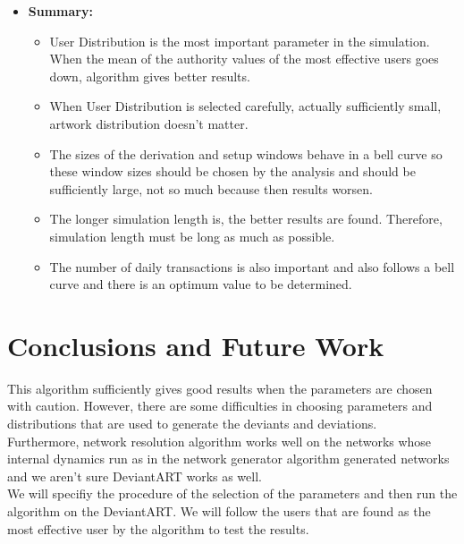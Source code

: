 \documentclass[12pt,a4paper]{report}
\begin{document}
	\begin{itemize}

	\item \textbf{Summary:}

		\begin{itemize}

		\item User Distribution is the most important parameter in the simulation. When the mean of the authority values of the most effective users goes down, algorithm gives better results.

		\item When User Distribution is selected carefully, actually sufficiently small, artwork distribution doesn't matter.

		\item The sizes of the derivation and setup windows behave in a bell curve so these window sizes should be chosen by the analysis and should be sufficiently large, not so much because then results worsen.

		\item The longer simulation length  is, the better results are found. Therefore,  simulation length must be long as much as possible.

		\item The number of daily transactions is also important and also follows a bell curve and there is an optimum value to be determined. 

		\end{itemize}

	\end{itemize}

\chapter{Conclusions and Future Work}

	This algorithm sufficiently gives good results when the parameters are chosen with caution. However, there are some difficulties in choosing parameters and distributions that are used to generate the deviants and deviations. \\

	Furthermore, network resolution algorithm works well on the networks whose internal dynamics run as in the network generator algorithm generated networks and we aren't sure DeviantART works as well. \\

	We will specifiy the procedure of the selection of the parameters and then run the algorithm on the DeviantART.  We will follow the users that are found as the most effective user by the algorithm to test the results. 
\end{document}
